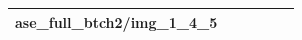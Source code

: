 \documentclass{article}
\begin{document}
\begin{table}[H]
\begin{tabularx}{\textwidth}{|c|X|X|X|X|X|}
ase_full_btch2/img_1_4_5} \\\hline

\end{tabularx}
\end{table}
\end{document}
